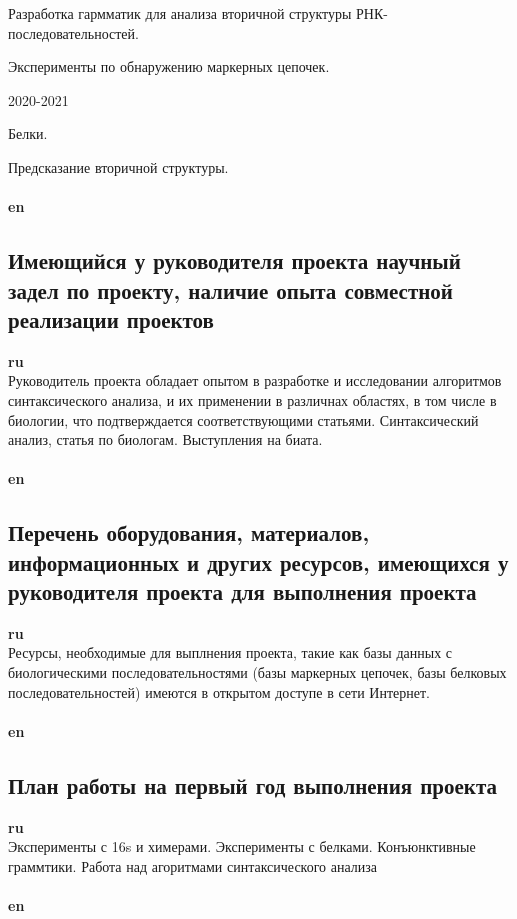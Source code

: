 \documentclass[12pt]{article}  %
\theoremstyle{remark}
\begin{document}
Разработка гармматик для анализа вторичной структуры РНК-последовательностей.

Эксперименты по обнаружению маркерных цепочек.


2020-2021

Белки.

Предсказание вторичной структуры.
\\
\\
\textbf{en}\\


\subsection{Имеющийся у руководителя проекта научный задел по проекту, наличие опыта совместной реализации проектов}

\textbf{ru}\\
Руководитель проекта обладает опытом в разработке и исследовании алгоритмов синтаксического анализа, и их применении в различнах областях, в том числе в биологии, что подтверждается соответствующими статьями.
Синтаксический анализ, статья по биологам. Выступления на биата.
\\
\\
\textbf{en}\\


\subsection{Перечень оборудования, материалов, информационных и других ресурсов, имеющихся у руководителя проекта для выполнения проекта }
\textbf{ru}\\
Ресурсы, необходимые для выплнения проекта, такие как базы данных с биологическими последовательностями (базы маркерных цепочек, базы белковых последовательностей) имеются в открытом доступе в сети Интернет.
\\
\\
\textbf{en}\\


\subsection{План работы на первый год выполнения проекта}

\textbf{ru}\\
Эксперименты с 16s и химерами. Эксперименты с белками. Конъюнктивные граммтики. Работа над агоритмами синтаксического анализа
\\
\\
\textbf{en}\\
\end{document}

